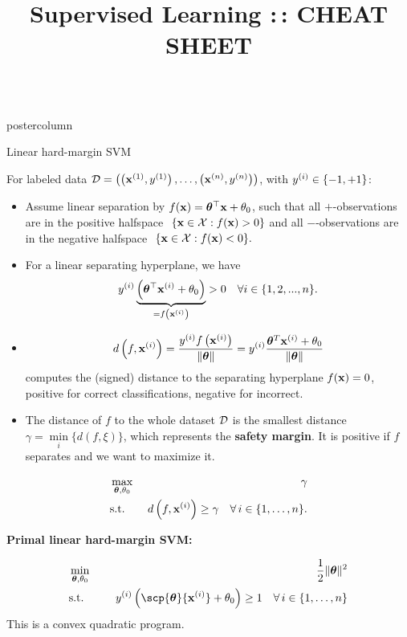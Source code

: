 \documentclass{beamer}
\title{Supervised Learning :\,: CHEAT SHEET} %
\newlength{\columnheight} %
\begin{document}
\begin{frame}[fragile]{}
\begin{columns}
	\begin{column}{.31\textwidth}
		\begin{beamercolorbox}[center]{postercolumn}
			\begin{minipage}{.98\textwidth}
				\parbox[t][\columnheight]{\textwidth}{

					\begin{myblock}{Linear hard-margin SVM}
      
For labeled data $\mathcal{D} = \left( \left(\mathbf{x}^{(1)}, y^{(1)}\right), \ldots, \left(\mathbf{x}^{(n)}, y^{(n)}\right)\right)$, with $y^{(i)} \in \{-1, +1\}$:
\begin{itemize}[$\bullet$]
  \setlength{\itemindent}{+.3in}
  \item Assume linear separation by $f(\mathbf{x}) = \bm{\theta}^\top \mathbf{x} + \theta_0$, such that all $+$-observations are in the positive halfspace
$
  \phantom{i}\{\mathbf{x} \in \mathcal{X}: f(\mathbf{x}) > 0\}
$
  and all $-$-observations are in the negative halfspace
$
  \phantom{i}\{\mathbf{x} \in \mathcal{X} : f(\mathbf{x}) < 0\}.
$

  \item For a linear separating hyperplane, we have
  $$
    y^{(i)} \underbrace{\left(\bm{\theta}^\top \mathbf{x}^{(i)} + \theta_0\right)}_{= f\left(\mathbf{x}^{(i)}\right)} > 0 \quad \forall i \in \{1, 2, ..., n\}.
  $$

  \item 
  $$
    d \left(f, \mathbf{x}^{(i)} \right) = \frac{y^{(i)} f\left(\mathbf{x}^{(i)}\right)}{\|\bm{\theta}\|} = y^{(i)} \frac{\bm{\theta}^T \mathbf{x}^{(i)} + \theta_0}{\|\bm{\theta}\|}
  $$
  computes the (signed) distance to the separating hyperplane $f(\mathbf{x}) = 0$,
    positive for correct classifications, negative for incorrect.
   \item The distance of $f$ to the whole dataset $\mathcal{D}$
    is the smallest distance
    $
    \gamma = \min\limits_i \Big\{ d \left(f, \xi \right) \Big\}
    $, which represents the \textbf{safety margin}. It is positive if $f$ separates and we want to maximize it.
\end{itemize}
\begin{eqnarray*}
    & \max\limits_{\bm{\theta}, \theta_0} & \gamma \\
    & \text{s.t.} & \,\, d \left(f, \mathbf{x}^{(i)} \right) \geq \gamma \quad \forall\, i \in \{1, \ldots, n\}.
    \end{eqnarray*}

    \begin{codebox}
\textbf{Primal linear hard-margin SVM:}
\end{codebox}				
								\begin{eqnarray*}
									& \min\limits_{\thetav, \theta_0} \quad & \frac{1}{2} \|\thetav\|^2 \\
									& \text{s.t.} & \,\,\yi  \left( \scp{\thetav}{\xi} + \theta_0 \right) \geq 1 \quad \forall\, i \in \nset
								\end{eqnarray*}
	This is a convex quadratic program.\\



\end{myblock}}
\end{minipage}
\end{beamercolorbox}
\end{column}
\end{columns}
\end{frame}
\end{document}
